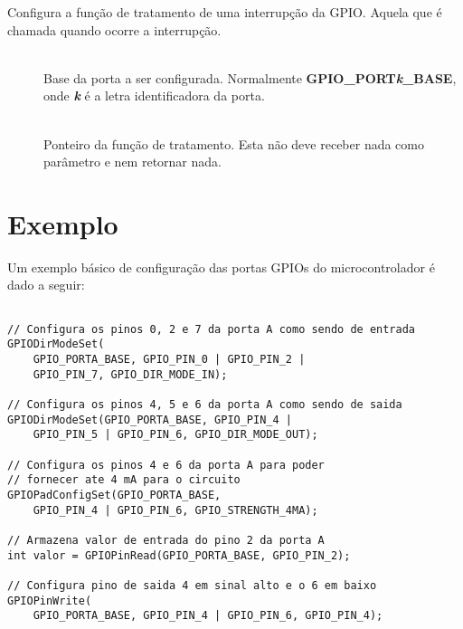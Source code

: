 Configura a função de tratamento de uma interrupção da GPIO. Aquela que é chamada quando ocorre a interrupção.

\begin{description}
	\item []\hfill \\
	Base da porta a ser configurada. Normalmente \textbf{GPIO\_PORT\emph{k}\_BASE}, onde \textbf{\emph{k}} é a letra identificadora da porta.
	
	\item []\hfill \\
	Ponteiro da função de tratamento. Esta não deve receber nada como parâmetro e nem retornar nada.
\end{description}

\section{Exemplo}

Um exemplo básico de configuração das portas GPIOs do microcontrolador é dado a seguir:

\begin{lstlisting}[style=citacao]

// Configura os pinos 0, 2 e 7 da porta A como sendo de entrada
GPIODirModeSet(
	GPIO_PORTA_BASE, GPIO_PIN_0 | GPIO_PIN_2 |
	GPIO_PIN_7, GPIO_DIR_MODE_IN);

// Configura os pinos 4, 5 e 6 da porta A como sendo de saida
GPIODirModeSet(GPIO_PORTA_BASE, GPIO_PIN_4 | 
	GPIO_PIN_5 | GPIO_PIN_6, GPIO_DIR_MODE_OUT);

// Configura os pinos 4 e 6 da porta A para poder 
// fornecer ate 4 mA para o circuito
GPIOPadConfigSet(GPIO_PORTA_BASE, 
	GPIO_PIN_4 | GPIO_PIN_6, GPIO_STRENGTH_4MA);

// Armazena valor de entrada do pino 2 da porta A
int valor = GPIOPinRead(GPIO_PORTA_BASE, GPIO_PIN_2);

// Configura pino de saida 4 em sinal alto e o 6 em baixo
GPIOPinWrite(
	GPIO_PORTA_BASE, GPIO_PIN_4 | GPIO_PIN_6, GPIO_PIN_4);

\end{lstlisting}


